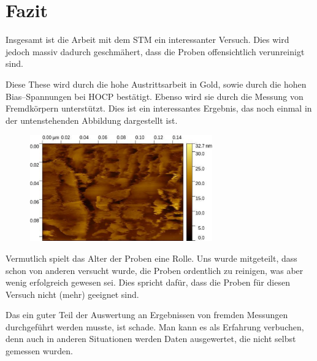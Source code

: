 \documentclass[12pt,a4paper]{scrartcl}
\numberwithin{equation}{section} %
\begin{document}
\clearpage
\hypertarget{fazit}{%
\section{Fazit}\label{fazit}}
Insgesamt ist die Arbeit mit dem STM ein interessanter Versuch. Dies wird jedoch massiv dadurch geschmähert, dass die Proben offensichtlich verunreinigt sind.

Diese These wird durch die hohe Austrittsarbeit in Gold, sowie durch die hohen Bias--Spannungen bei HOCP bestätigt. Ebenso wird sie durch die Messung von Fremdkörpern unterstützt. Dies ist ein interessantes Ergebnis, das noch einmal in der untenstehenden Abbildung dargestellt ist.

\begin{figure}[h!]
	\centering
	\includegraphics[width=0.7\textwidth]{../media/B2.5/Gold_gross.pdf}
\end{figure}

\noindent
Vermutlich spielt das Alter der Proben eine Rolle. Uns wurde mitgeteilt, dass schon von anderen versucht wurde, die Proben ordentlich zu reinigen, was aber wenig erfolgreich gewesen sei. Dies spricht dafür, dass die Proben für diesen Versuch nicht (mehr) geeignet sind.

Das ein guter Teil der Auswertung an Ergebnissen von fremden Messungen durchgeführt werden musste, ist schade. Man kann es als Erfahrung verbuchen, denn auch in anderen Situationen werden Daten ausgewertet, die nicht selbst gemessen wurden.
\end{document}
